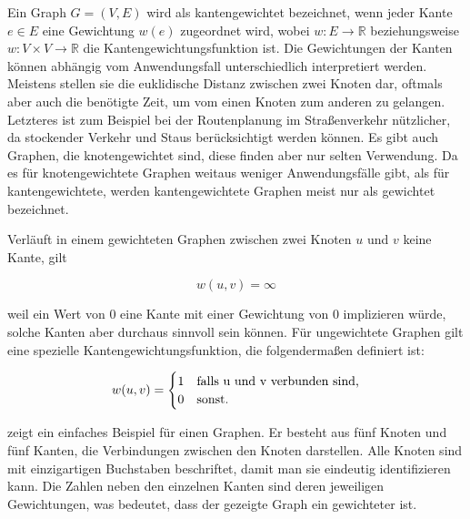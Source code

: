             Ein Graph $G = (V, E)$ wird als kantengewichtet bezeichnet, wenn jeder Kante $e \in E$ eine Gewichtung $w(e)$ zugeordnet wird, wobei $w: E \rightarrow \mathbb{R}$ beziehungsweise $w: V \times V \rightarrow \mathbb{R}$ die Kantengewichtungsfunktion ist. Die Gewichtungen der Kanten können abhängig vom Anwendungsfall unterschiedlich interpretiert werden. Meistens stellen sie die euklidische Distanz zwischen zwei Knoten dar, oftmals aber auch die benötigte Zeit, um vom einen Knoten zum anderen zu gelangen. Letzteres ist zum Beispiel bei der Routenplanung im Straßenverkehr nützlicher, da stockender Verkehr und Staus berücksichtigt werden können. Es gibt auch Graphen, die knotengewichtet sind, diese finden aber nur selten Verwendung. Da es für knotengewichtete Graphen weitaus weniger Anwendungsfälle gibt, als für kantengewichtete, werden kantengewichtete Graphen meist nur als gewichtet bezeichnet. \cite{EZ:Web04, EZ:Web10, EZ:Web22, EZ:Web32, EZ:Web35}
            
            Verläuft in einem gewichteten Graphen zwischen zwei Knoten $u$ und $v$ keine Kante, gilt
            
                \[w(u, v) = \infty\]
            
            weil ein Wert von $0$ eine Kante mit einer Gewichtung von $0$ implizieren würde, solche Kanten aber durchaus sinnvoll sein können. Für ungewichtete Graphen gilt eine spezielle Kantengewichtungsfunktion, die folgendermaßen definiert ist:

                \[
                    w(u, v) =   \begin{cases}
                                    1 & $falls u und v verbunden sind,$\\
                                    0 & $sonst.$
                                \end{cases}
                \]
            
             zeigt ein einfaches Beispiel für einen Graphen. Er besteht aus fünf Knoten und fünf Kanten, die Verbindungen zwischen den Knoten darstellen. Alle Knoten sind mit einzigartigen Buchstaben beschriftet, damit man sie eindeutig identifizieren kann. Die Zahlen neben den einzelnen Kanten sind deren jeweiligen Gewichtungen, was bedeutet, dass der gezeigte Graph ein gewichteter ist. \cite{EZ:Web42, EZ:Web43}
            
